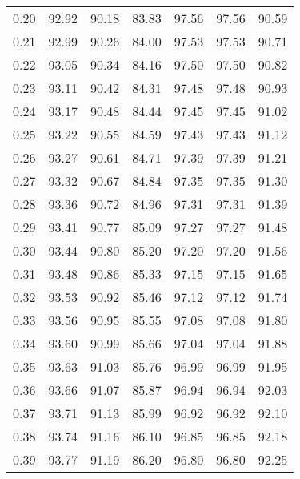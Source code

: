 \begin{tabular}{|c|c|c|c|c|c|c|}
      0.20 &     92.92 &     90.18 &      83.83 &   97.56 &      97.56 &         90.59 \\
      0.21 &     92.99 &     90.26 &      84.00 &   97.53 &      97.53 &         90.71 \\
      0.22 &     93.05 &     90.34 &      84.16 &   97.50 &      97.50 &         90.82 \\
      0.23 &     93.11 &     90.42 &      84.31 &   97.48 &      97.48 &         90.93 \\
      0.24 &     93.17 &     90.48 &      84.44 &   97.45 &      97.45 &         91.02 \\
      0.25 &     93.22 &     90.55 &      84.59 &   97.43 &      97.43 &         91.12 \\
      0.26 &     93.27 &     90.61 &      84.71 &   97.39 &      97.39 &         91.21 \\
      0.27 &     93.32 &     90.67 &      84.84 &   97.35 &      97.35 &         91.30 \\
      0.28 &     93.36 &     90.72 &      84.96 &   97.31 &      97.31 &         91.39 \\
      0.29 &     93.41 &     90.77 &      85.09 &   97.27 &      97.27 &         91.48 \\
      0.30 &     93.44 &     90.80 &      85.20 &   97.20 &      97.20 &         91.56 \\
      0.31 &     93.48 &     90.86 &      85.33 &   97.15 &      97.15 &         91.65 \\
      0.32 &     93.53 &     90.92 &      85.46 &   97.12 &      97.12 &         91.74 \\
      0.33 &     93.56 &     90.95 &      85.55 &   97.08 &      97.08 &         91.80 \\
      0.34 &     93.60 &     90.99 &      85.66 &   97.04 &      97.04 &         91.88 \\
      0.35 &     93.63 &     91.03 &      85.76 &   96.99 &      96.99 &         91.95 \\
      0.36 &     93.66 &     91.07 &      85.87 &   96.94 &      96.94 &         92.03 \\
      0.37 &     93.71 &     91.13 &      85.99 &   96.92 &      96.92 &         92.10 \\
      0.38 &     93.74 &     91.16 &      86.10 &   96.85 &      96.85 &         92.18 \\
      0.39 &     93.77 &     91.19 &      86.20 &   96.80 &      96.80 &         92.25 \\

\end{tabular}
